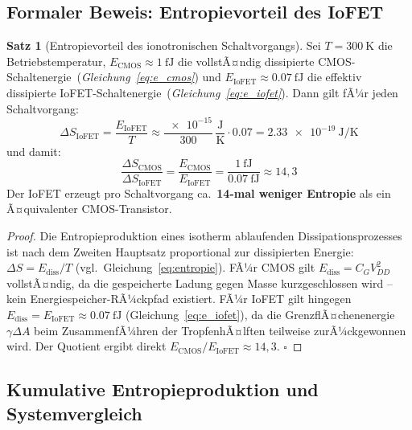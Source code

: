 ﻿\documentclass[12pt, a4paper]{report}
\theoremstyle{definition}
\newtheorem{theorem}{Satz}[section]
\theoremstyle{remark}
\begin{document}
\subsection{Formaler Beweis: Entropievorteil des IoFET}

\begin{theorem}[Entropievorteil des ionotronischen Schaltvorgangs]
  \label{thm:entropie_iofet}
  Sei $T = \SI{300}{\kelvin}$ die Betriebstemperatur,
  $E_\text{CMOS} \approx \SI{1}{\femto\joule}$ die vollstÃ¤ndig dissipierte
  CMOS-Schaltenergie~\textup{(}\emph{Gleichung~\eqref{eq:e_cmos}}\textup{)}
  und $E_\text{IoFET} \approx \SI{0.07}{\femto\joule}$ die effektiv
  dissipierte IoFET-Schaltenergie~\textup{(}\emph{Gleichung~\eqref{eq:e_iofet}}\textup{)}.
  Dann gilt fÃ¼r jeden Schaltvorgang:
  \begin{equation}
    \Delta S_\text{IoFET} = \frac{E_\text{IoFET}}{T}
    \approx \frac{\num{e-15}}{300}\,\frac{\mathrm{J}}{\mathrm{K}}
    \cdot 0.07
    = \SI{2.33e-19}{\joule\per\kelvin}
    \label{eq:ds_iofet}
  \end{equation}
  und damit:
  \begin{equation}
    \frac{\Delta S_\text{CMOS}}{\Delta S_\text{IoFET}}
    = \frac{E_\text{CMOS}}{E_\text{IoFET}}
    = \frac{\SI{1}{\femto\joule}}{\SI{0.07}{\femto\joule}}
    \approx 14{,}3
    \label{eq:entropie_ratio}
  \end{equation}
  Der IoFET erzeugt pro Schaltvorgang ca.\ \textbf{14-mal weniger Entropie}
  als ein Ã¤quivalenter CMOS-Transistor.
\end{theorem}

\begin{proof}
  Die Entropieproduktion eines isotherm ablaufenden Dissipationsprozesses
  ist nach dem Zweiten Hauptsatz proportional zur dissipierten Energie:
  $\Delta S = E_\text{diss} / T$ (vgl.\ Gleichung~\eqref{eq:entropie}).
  FÃ¼r CMOS gilt $E_\text{diss} = C_G V_{DD}^2$ vollstÃ¤ndig, da die gespeicherte
  Ladung gegen Masse kurzgeschlossen wird -- kein Energiespeicher-RÃ¼ckpfad
  existiert. FÃ¼r IoFET gilt hingegen
  $E_\text{diss} = E_\text{IoFET} \approx \SI{0.07}{\femto\joule}$
  (Gleichung~\eqref{eq:e_iofet}), da die GrenzflÃ¤chenenergie $\gamma \Delta A$
  beim ZusammenfÃ¼hren der TropfenhÃ¤lften teilweise zurÃ¼ckgewonnen wird.
  Der Quotient ergibt direkt $E_\text{CMOS} / E_\text{IoFET} \approx 14{,}3$.
  $\square$
\end{proof}

\subsection{Kumulative Entropieproduktion und Systemvergleich}
\end{document}
